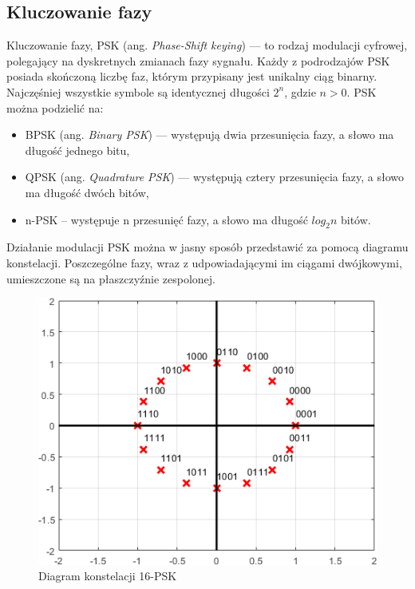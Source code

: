 \documentclass{article}
\begin{document}
	\subsection{Kluczowanie fazy}
		Kluczowanie fazy, PSK (ang. \textit{Phase-Shift keying}) --- to rodzaj modulacji cyfrowej, polegający na dyskretnych zmianach fazy sygnału. Każdy z podrodzajów PSK posiada skończoną liczbę faz, którym przypisany jest unikalny ciąg binarny. Najczęśniej wszystkie symbole są identycznej długości $2^{n}$, gdzie $n > 0$. PSK można podzielić na:
		\begin{itemize}
			\item BPSK (ang. \textit{Binary PSK}) --- występują dwia przesunięcia fazy, a słowo ma długość jednego bitu,
			\item QPSK (ang. \textit{Quadrature PSK}) --- występują cztery przesunięcia fazy, a słowo ma długość dwóch bitów,
			\item n-PSK -- występuje n przesunięć fazy, a słowo ma długość $log_{2}n$ bitów.
		\end{itemize}
		Działanie modulacji PSK można w jasny sposób przedstawić za pomocą diagramu konstelacji. Poszczególne fazy, wraz z udpowiadającymi im ciągami dwójkowymi, umieszczone są na płaszczyźnie zespolonej.
		\begin{figure}[H]
			\centering
			\includegraphics[width=0.8\linewidth]{img/intro_psk_constelation.png}
			\caption{Diagram konstelacji 16-PSK}
			\label{fig:intro_psk_constelation}
		\end{figure}
\end{document}

